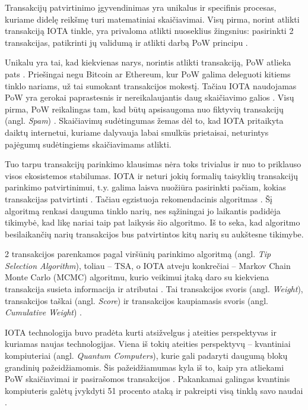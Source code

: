 Transakcijų patvirtinimo įgyvendinimas yra unikalus ir specifinis procesas, kuriame didelę reikšmę turi matematiniai skaičiavimai. Visų pirma, norint atlikti transakciją IOTA tinkle, yra privaloma atlikti nuoseklius žingsnius: pasirinkti 2 transakcijas, patikrinti jų validumą ir atlikti darbą PoW principu \cite{popov2016tangle}. 

Unikalu yra tai, kad kiekvienas narys, norintis atlikti transakciją, PoW atlieka pats \cite{bramas2018stability}. Priešingai negu Bitcoin ar Ethereum, kur PoW galima deleguoti kitiems tinklo nariams, už tai sumokant transakcijos mokestį. Tačiau IOTA naudojamas PoW yra gerokai paprastesnis ir nereikalaujantis daug skaičiavimo galios \cite{popov2016tangle}. Visų pirma, PoW reikalingas tam, kad būtų apsisaugoma nuo fiktyvių transakcijų (angl. \textit{Spam}) \cite{popov2016tangle}. Skaičiavimų sudėtingumas žemas dėl to, kad IOTA pritaikyta daiktų internetui, kuriame dalyvauja labai smulkūs prietaisai, neturintys pajėgumų sudėtingiems skaičiavimams atlikti.

Tuo tarpu transakcijų parinkimo klausimas nėra toks trivialus ir nuo to priklauso visos ekosistemos stabilumas. IOTA ir neturi jokių formalių taisyklių transakcijų parinkimo patvirtinimui, t.y. galima laisva nuožiūra pasirinkti pačiam, kokias transakcijas patvirtinti \cite{popov2016tangle}. Tačiau egzistuoja rekomendacinis algoritmas \cite{popov2016tangle}. Šį algoritmą renkasi dauguma tinklo narių, nes sąžiningai jo laikantis padidėja tikimybė, kad likę nariai taip pat laikysis šio algoritmo. Iš to seka, kad algoritmo besilaikančių narių transakcijos bus patvirtintos kitų narių su aukštesne tikimybe.

2 transakcijos parenkamos pagal viršūnių parinkimo algoritmą (angl. \textit{Tip Selection Algorithm}), toliau – TSA, o IOTA atveju konkrečiai – Markov Chain Monte Carlo (MCMC) algoritmu, kurio veikimui įtaką daro su kiekviena transakcija susieta informacija ir atributai \cite{bramas2018stability}. Tai transakcijos svoris (angl. \textit{Weight}), transakcijos taškai (angl. \textit{Score}) ir transakcijos kaupiamasis svoris (angl. \textit{Cumulative Weight}) \cite{popov2016tangle}. 





IOTA technologija buvo pradėta kurti atsižvelgus į ateities perspektyvas ir kuriamas naujas technologijas. Viena iš tokių ateities perspektyvų – kvantiniai kompiuteriai (angl. \textit{Quantum Computers}), kurie gali padaryti daugumą blokų grandinių pažeidžiamomis. Šis pažeidžiamumas kyla iš to, kaip yra atliekami PoW skaičiavimai ir pasirašomos transakcijos \cite{kiktenko2018quantum}. Pakankamai galingas kvantinis kompiuteris galėtų įvykdyti 51 procento ataką ir pakreipti visą tinklą savo naudai \cite{kiktenko2018quantum}. 

